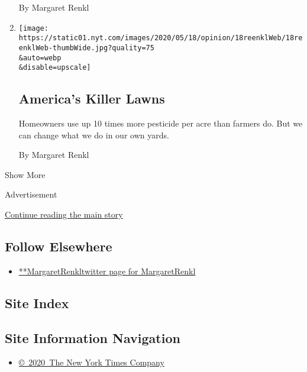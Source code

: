 \begin{enumerate}
  By Margaret Renkl
\item
  \href{/2020/05/18/opinion/lawn-pesticides-insect-extinction.html}{}

  \texttt{[image: https://static01.nyt.com/images/2020/05/18/opinion/18reenklWeb/18reenklWeb-thumbWide.jpg?quality=75\\\&auto=webp\\\&disable=upscale]}

  \hypertarget{americas-killer-lawns}{%
  \subsection{America's Killer Lawns}\label{americas-killer-lawns}}

  Homeowners use up 10 times more pesticide per acre than farmers do.
  But we can change what we do in our own yards.

  By Margaret Renkl
\end{enumerate}

Show More

Advertisement

\protect\hyperlink{after-mid2}{Continue reading the main story}

\hypertarget{follow-elsewhere}{%
\subsection{Follow Elsewhere}\label{follow-elsewhere}}

\begin{itemize}
\tightlist
\item
  \href{https://twitter.com/MargaretRenkl}{**MargaretRenkltwitter page
  for MargaretRenkl}
\end{itemize}

\hypertarget{site-index}{%
\subsection{Site Index}\label{site-index}}

\hypertarget{site-information-navigation}{%
\subsection{Site Information
Navigation}\label{site-information-navigation}}

\begin{itemize}
\tightlist
\item
  \href{https://help.nytimes.com/hc/en-us/articles/115014792127-Copyright-notice}{©~2020~The
  New York Times Company}
\end{itemize}

